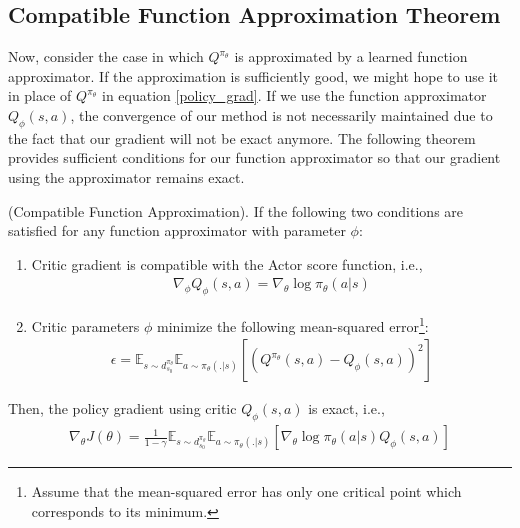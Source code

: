 \subsection{Compatible Function Approximation Theorem}

Now, consider the case in which $Q^{\pi_\theta}$ is approximated by a learned function approximator. If the approximation is sufficiently good, we might hope to use it in place of $Q^{\pi_\theta}$ in equation \ref{policy_grad}. If we use the function approximator $Q_{\phi}(s, a)$, the convergence of our method is not necessarily maintained due to the fact that our gradient will not be exact anymore. The following theorem provides sufficient conditions for our function approximator so that our gradient using the approximator remains exact.

\begin{theorem}\label{thm:compatible_approximator}
    (Compatible Function Approximation). If the following two conditions are satisfied for any function approximator with parameter $\phi$:
    \begin{enumerate}
        \item Critic gradient is compatible with the Actor score function, i.e., 
        \begin{align*}
            \nabla_{\phi} Q_\phi(s, a) = \nabla_\theta \log \pi_\theta (a|s)
        \end{align*}
        \item Critic parameters $\phi$ minimize the following mean-squared error\footnote{Assume that the mean-squared error has only one critical point which corresponds to its minimum.}: 
        \begin{align*}
            \epsilon = \mathbb{E}_{s \sim d^{\pi_\theta}_{s_0}}\mathbb{E}_{a \sim \pi_\theta(.|s)} [(Q^{\pi_\theta} (s, a) - Q_\phi(s, a))^2]
        \end{align*}
    \end{enumerate}
    Then, the policy gradient using critic $Q_\phi(s, a)$ is exact, i.e., 
    \begin{align*}
            \nabla_\theta J(\theta) = \frac{1}{1-\gamma}\mathbb{E}_{s \sim d^{\pi_\theta}_{s_0}}\mathbb{E}_{a \sim \pi_\theta(.|s)} [\nabla_\theta \log \pi_\theta (a|s) Q_\phi (s, a)]
    \end{align*}
\end{theorem}

